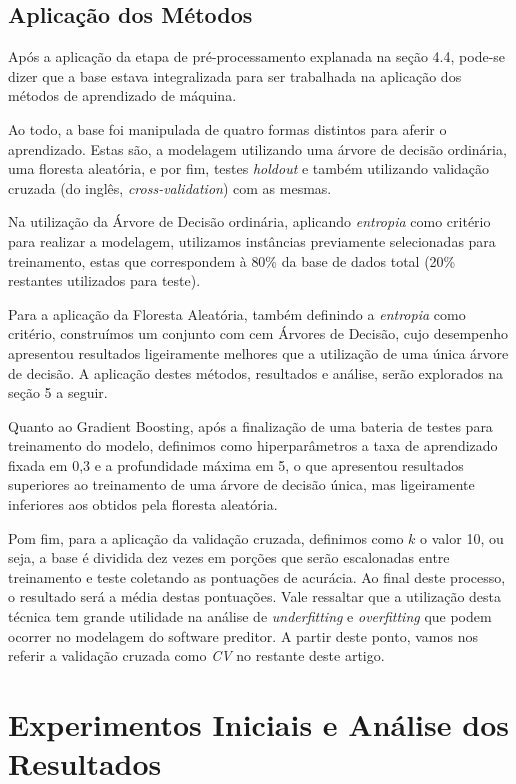 \documentclass[12pt]{article}
\begin{document}
\subsection{Aplicação dos Métodos}

Após a aplicação da etapa de pré-processamento explanada na seção 4.4, pode-se dizer que a base estava integralizada para ser trabalhada na aplicação dos métodos de aprendizado de máquina.

Ao todo, a base foi manipulada de quatro formas distintos para aferir o aprendizado. Estas são, a modelagem utilizando uma árvore de decisão ordinária, uma floresta aleatória, e por fim, testes \emph{holdout} e também utilizando validação cruzada (do inglês, \emph{cross-validation}) com as mesmas.

Na utilização da Árvore de Decisão ordinária, aplicando \emph{entropia} como critério para realizar a modelagem, utilizamos instâncias previamente selecionadas para treinamento, estas que correspondem à 80\% da base de dados total (20\% restantes utilizados para teste).

Para a aplicação da Floresta Aleatória, também definindo a \emph{entropia} como critério, construímos um conjunto com cem Árvores de Decisão, cujo desempenho apresentou resultados ligeiramente melhores que a utilização de uma única árvore de decisão. A aplicação destes métodos, resultados e análise, serão explorados na seção 5 a seguir.

Quanto ao Gradient Boosting, após a finalização de uma bateria de testes para treinamento do modelo, definimos como hiperparâmetros a taxa de aprendizado fixada em 0,3 e a profundidade máxima em 5, o que apresentou resultados superiores ao treinamento de uma árvore de decisão única, mas ligeiramente inferiores aos obtidos pela floresta aleatória. 

Pom fim, para a aplicação da validação cruzada, definimos como \(k\) o valor 10, ou seja, a base é dividida dez vezes em porções que serão escalonadas entre treinamento e teste coletando as pontuações de acurácia. Ao final deste processo, o resultado será a média destas pontuações. Vale ressaltar que a utilização desta técnica tem grande utilidade na análise de \emph{underfitting} e \emph{overfitting} que podem ocorrer no modelagem do software preditor. A partir deste ponto, vamos nos referir a validação cruzada como \emph{CV} no restante deste artigo.

\section{Experimentos Iniciais e Análise dos Resultados}
\end{document}
